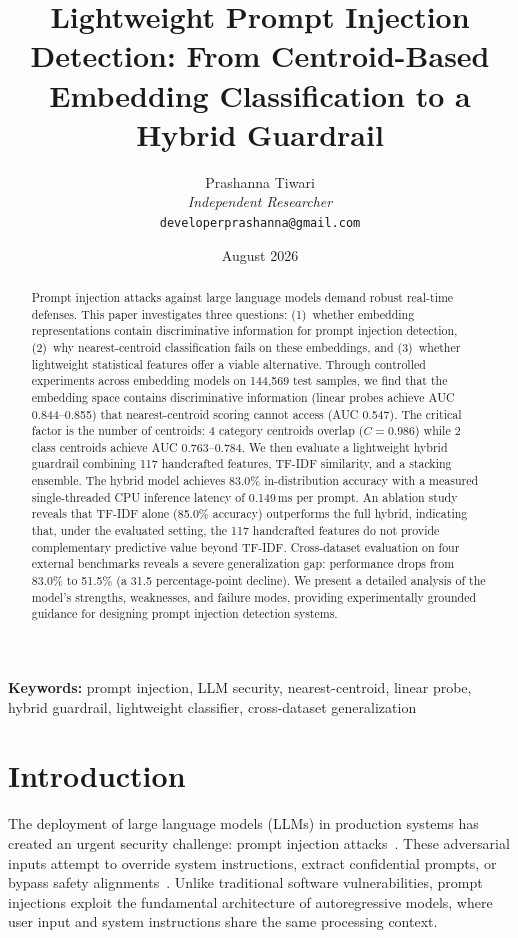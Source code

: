 \documentclass[12pt,a4paper]{article}
\title{Lightweight Prompt Injection Detection: From Centroid-Based Embedding Classification to a Hybrid Guardrail}
\author{Prashanna Tiwari \\
\textit{Independent Researcher} \\
\texttt{developerprashanna@gmail.com}}
\date{August 2026}
\begin{document}
\maketitle

\begin{abstract}
Prompt injection attacks against large language models demand robust real-time defenses. This paper investigates three questions: (1)~whether embedding representations contain discriminative information for prompt injection detection, (2)~why nearest-centroid classification fails on these embeddings, and (3)~whether lightweight statistical features offer a viable alternative. Through controlled experiments across embedding models on 144,569 test samples, we find that the embedding space contains discriminative information (linear probes achieve AUC 0.844--0.855) that nearest-centroid scoring cannot access (AUC 0.547). The critical factor is the number of centroids: 4 category centroids overlap ($C = 0.986$) while 2 class centroids achieve AUC 0.763--0.784. We then evaluate a lightweight hybrid guardrail combining 117 handcrafted features, TF-IDF similarity, and a stacking ensemble. The hybrid model achieves 83.0\% in-distribution accuracy with a measured single-threaded CPU inference latency of 0.149\,ms per prompt. An ablation study reveals that TF-IDF alone (85.0\% accuracy) outperforms the full hybrid, indicating that, under the evaluated setting, the 117 handcrafted features do not provide complementary predictive value beyond TF-IDF. Cross-dataset evaluation on four external benchmarks reveals a severe generalization gap: performance drops from 83.0\% to 51.5\% (a 31.5 percentage-point decline). We present a detailed analysis of the model's strengths, weaknesses, and failure modes, providing experimentally grounded guidance for designing prompt injection detection systems.
\end{abstract}

\noindent\textbf{Keywords:} prompt injection, LLM security, nearest-centroid, linear probe, hybrid guardrail, lightweight classifier, cross-dataset generalization

\section{Introduction}\label{sec:intro}

The deployment of large language models (LLMs) in production systems has created an urgent security challenge: prompt injection attacks~\citep{schulhoff2023hackaprompt, greshake2023not}. These adversarial inputs attempt to override system instructions, extract confidential prompts, or bypass safety alignments~\citep{liu2023prompt}. Unlike traditional software vulnerabilities, prompt injections exploit the fundamental architecture of autoregressive models, where user input and system instructions share the same processing context.
\end{document}

